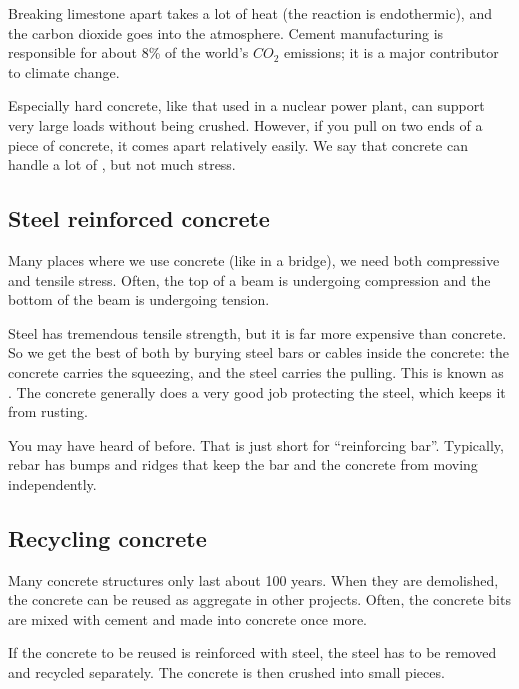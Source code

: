 Breaking limestone apart takes a lot of heat (the reaction is endothermic), and the carbon dioxide goes into the atmosphere. Cement manufacturing
is responsible for about 8\% of the world's $CO_2$ emissions; it is a
major contributor to climate change.

Especially hard concrete, like that used in a nuclear power plant, can
support very large loads without being crushed. However, if
you pull on two ends of a piece of concrete, it comes apart relatively
easily. We say that concrete can handle a lot of , but not much  stress.

\subsection{Steel reinforced concrete}

Many places where we use concrete (like in a bridge), we need both
compressive and tensile stress. Often, the top of a beam is undergoing
compression and the bottom of the beam is undergoing tension.


Steel has tremendous tensile strength, but it is far more expensive than concrete. So we get the best of both by burying steel bars or cables inside the concrete: the concrete carries the squeezing, and the steel carries the pulling.
This is known as . The concrete
generally does a very good job protecting the steel, which keeps it
from rusting.

You may have heard of  before. That is just short for
``reinforcing bar''.  Typically, rebar has bumps and ridges that keep
the bar and the concrete from moving independently.

\subsection{Recycling concrete}

Many concrete structures only last about 100 years. When they are
demolished, the concrete can be reused as aggregate in other projects.
Often, the concrete bits are mixed with cement and made into concrete once more.

If the concrete to be reused is reinforced with steel, the steel has
to be removed and recycled separately.  The concrete is then crushed
into small pieces.


